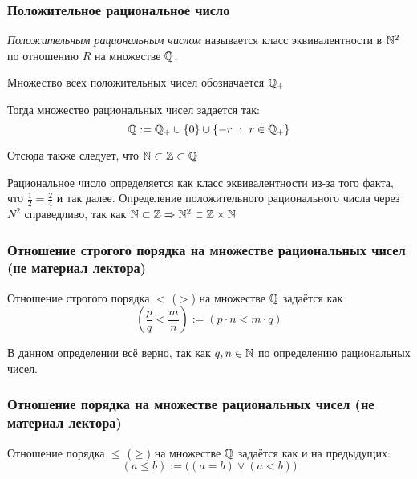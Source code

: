 \subsubsection*{Положительное рациональное число}

\begin{definition}
    \textit{Положительным рациональным числом} называется
    класс эквивалентности в $\mathbb{N}^2$ по отношению $R$
    на множестве $\mathbb{Q}$.
\end{definition}
    
Множество всех положительных чисел обозначается $\mathbb{Q}_+$
    
Тогда множество рациональных чисел задается так:
\[\mathbb{Q} := \mathbb{Q}_+ \cup \{0\} \cup \{-r\ :\ r \in \mathbb{Q}_+\}\]
    
Отсюда также следует, что $\mathbb{N} \subset \mathbb{Z} \subset \mathbb{Q}$ 

\begin{anote}
    Рациональное число определяется как класс
    эквивалентности из-за того факта, что
    $\frac{1}{2} = \frac{2}{4}$ и так далее.
    Определение положительного рационального числа
    через $N^2$ справедливо, так как
    $\mathbb{N} \subset\mathbb{Z} \Rightarrow \mathbb{N}^2 \subset \mathbb{Z} \times \mathbb{N}$
\end{anote}

\subsubsection*{Отношение строгого порядка на множестве
рациональных чисел (не материал лектора)}

\begin{definition}
    Отношение строгого порядка $<$ ($>$) на
    множестве $\mathbb{Q}$ задаётся как
    \[
        \left(\frac{p}{q} < \frac{m}{n}\right)
        := (p \cdot n < m \cdot q)
    \]
\end{definition}

\begin{anote}
    В данном определении всё верно, так как
    $q, n \in \mathbb{N}$ по определению рациональных чисел.
\end{anote}

\subsubsection*{Отношение порядка на множестве
рациональных чисел (не материал лектора)}

\begin{definition}
    Отношение порядка $\le$ ($\ge$) на множестве
    $\mathbb{Q}$ задаётся как и на предыдущих:
    \[
        (a \le b) := \big((a = b) \vee (a < b)\big)
    \]
\end{definition}

